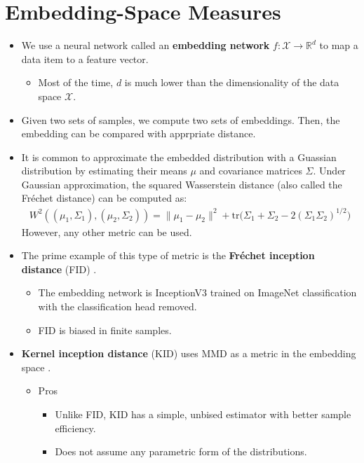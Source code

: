 \documentclass[10pt]{article}
\newcommand{\ra}{\rightarrow}
\newcommand{\mcal}[1]{\mathcal{#1}}
\newcommand{\tr}{\mathrm{tr}}
\newcommand{\Real}{\mathbb{R}}
\begin{document}
\section{Embedding-Space Measures}

\begin{itemize}
    \item We use a neural network called an {\bf embedding network} $f: \mcal{X} \ra \Real^d$ to map a data item to a feature vector.
    \begin{itemize}
        \item Most of the time, $d$ is much lower than the dimensionality of the data space $\mcal{X}$.
    \end{itemize}

    \item Given two sets of samples, we compute two sets of embeddings. Then, the embedding can be compared with apprpriate distance.
    
    \item It is common to approximate the embedded distribution with a Guassian distribution by estimating their means $\mu$ and covariance matrices $\Sigma$. Under Gaussian approximation, the squared Wasserstein distance (also called the Fr\'{e}chet distance) can be computed as:
    \begin{align*}
        W^2((\mu_1, \Sigma_1), (\mu_2, \Sigma_2)) = \| \mu_1 - \mu_2 \|^2 + \tr\big( \Sigma_1 + \Sigma_2 - 2(\Sigma_1\Sigma_2)^{1/2}\big)
    \end{align*}    
    However, any other metric can be used.

    \item The prime example of this type of metric is the {\bf Fr\'{e}chet inception distance} (FID) \cite{Heusel:2018}.
    \begin{itemize}
        \item The embedding network is InceptionV3 \cite{Szegedy:2015} trained on ImageNet classification with the classification head removed.
        
        \item FID is biased in finite samples.
    \end{itemize}

    \item {\bf Kernel inception distance} (KID) uses MMD as a metric in the embedding space \cite{Binkowski:2021}. 
    \begin{itemize}
        \item Pros
        \begin{itemize}
            \item Unlike FID, KID has a simple, unbised estimator with better sample efficiency.
            \item Does not assume any parametric form of the distributions.
        \end{itemize}
        

\end{itemize}
\end{itemize}
\end{document}
